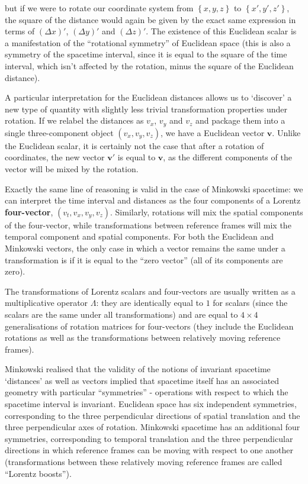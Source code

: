 \documentclass[12pt]{article}
\begin{document}
but if we were to rotate our coordinate system from $\left\{x, y, z\right\}$ to $\left\{x', y', z'\right\}$, the square of the distance would again be given by the exact same expression in terms of ${\left(\Delta x\right)}'$, ${\left(\Delta y\right)}'$ and ${\left(\Delta z\right)}'$. The existence of this Euclidean scalar is a manifestation of the ``rotational symmetry'' of Euclidean space (this is also a symmetry of the spacetime interval, since it is equal to the square of the time interval, which isn't affected by the rotation, minus the square of the Euclidean distance).
\newline

A particular interpretation for the Euclidean distances allows us to `discover' a new type of quantity with slightly less trivial transformation properties under rotation. If we relabel the distances as $v_x$, $v_y$ and $v_z$ and package them into a single three-component object $\left(v_x, v_y, v_z\right)$, we have a Euclidean vector $\mathbf{v}$. Unlike the Euclidean scalar, it is certainly not the case that after a rotation of coordinates, the new vector $\mathbf{v}'$ is equal to $\mathbf{v}$, as the different components of the vector will be mixed by the rotation.
\newline

Exactly the same line of reasoning is valid in the case of Minkowski spacetime: we can interpret the time interval and distances as the four components of a Lorentz \textbf{four-vector}, $\left(v_t, v_x, v_y, v_z\right)$. Similarly, rotations will mix the spatial components of the four-vector, while transformations between reference frames will mix the temporal component and spatial components. For both the Euclidean and Minkowski vectors, the only case in which a vector remains the same under a transformation is if it is equal to the ``zero vector'' (all of its components are zero).
\newline

The transformations of Lorentz scalars and four-vectors are usually written as a multiplicative operator $\Lambda$: they are identically equal to $1$ for scalars (since the scalars are the same under all transformations) and are equal to $4 \times 4$ generalisations of rotation matrices for four-vectors (they include the Euclidean rotations as well as the transformations between relatively moving reference frames).
\newline

Minkowski realised that the validity of the notions of invariant spacetime `distances' as well as vectors implied that spacetime itself has an associated geometry with particular ``symmetries'' - operations with respect to which the spacetime interval is invariant. Euclidean space has six independent symmetries, corresponding to the three perpendicular directions of spatial translation and the three perpendicular axes of rotation. Minkowski spacetime has an additional four symmetries, corresponding to temporal translation and the three perpendicular directions in which reference frames can be moving with respect to one another (transformations between these relatively moving reference frames are called ``Lorentz boosts'').
\newline
\end{document}
